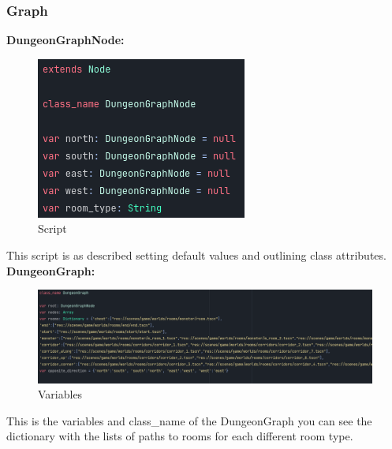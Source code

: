 \documentclass{article}
\begin{document}
        \subsubsection{Graph}
        \textbf{DungeonGraphNode:}\\
        \begin{figure}[H]
                \centering
                \includegraphics[width = 0.8\columnwidth]{images/development/DungeonGraphNode_script.PNG}
                \caption{Script}
        \end{figure}
        This script is as described setting default values and outlining class attributes.\\
        \textbf{DungeonGraph:}\\
        \begin{figure}[H]
                \centering
                \includegraphics[width = 0.8\columnwidth]{images/development/DungeonGraph_variables.PNG}
                \caption{Variables}
        \end{figure}
        This is the variables and class\_name of the DungeonGraph you can see the dictionary with the lists of paths to rooms for each different room type.\\
\end{document}
